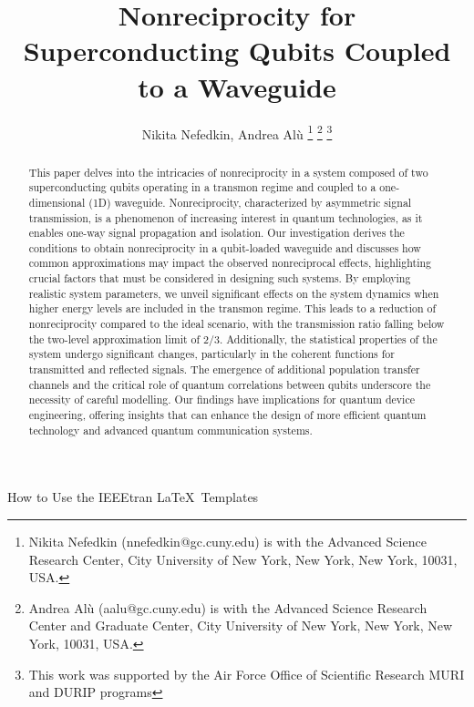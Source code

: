\documentclass[lettersize,journal]{IEEEtran}
\providecommand{\DIFaddtex}[1]{{\protect\color{blue}\uwave{#1}}} %
\providecommand{\DIFaddbegin}{} %
\providecommand{\DIFaddend}{} %
\providecommand{\DIFadd}[1]{\texorpdfstring{\DIFaddtex{#1}}{#1}} %
\newcommand{\DIFaddincludegraphics}[2][]{{\color{blue}\fbox{\DIFOincludegraphics[#1]{#2}}}} %
\DeclareRobustCommand{\DIFaddbegin}{\DIFOaddbegin \let\includegraphics\DIFaddincludegraphics} %
\DeclareRobustCommand{\DIFaddend}{\DIFOaddend \let\includegraphics\DIFOincludegraphics} %
\begin{document}
\title{\DIFaddbegin \DIFadd{Theory and Analysis of }\DIFaddend Nonreciprocity for Superconducting Qubits Coupled to a Waveguide}
\author{Nikita Nefedkin, Andrea Al{\`u} 
\thanks{Nikita Nefedkin (nnefedkin@gc.cuny.edu) is with the Advanced Science Research Center, City University of New York, New York, New York, 10031, USA.}
\thanks{Andrea Al\`u (aalu@gc.cuny.edu) is with the Advanced Science Research Center and Graduate Center, City University of New York, New York, New York, 10031, USA.}
\thanks{This work was supported by the Air Force Office of Scientific Research MURI and DURIP programs}}

%
{How to Use the IEEEtran \LaTeX \ Templates}

\maketitle

\begin{abstract}
This paper delves into the intricacies of nonreciprocity in a system composed of two superconducting qubits operating in a transmon regime and coupled to a one-dimensional (1D) waveguide. Nonreciprocity, characterized by asymmetric signal transmission, is a phenomenon of increasing interest in quantum technologies, as it enables one-way signal propagation and isolation. Our investigation derives the conditions to obtain nonreciprocity in a qubit-loaded waveguide and discusses how common approximations may impact the observed nonreciprocal effects, highlighting crucial factors that must be considered in designing such systems. By employing realistic system parameters, we unveil significant effects on the system dynamics when higher energy levels are included in the transmon regime. This leads to a reduction of nonreciprocity compared to the ideal scenario, with the transmission ratio falling below the two-level approximation limit of $2/3$. Additionally, the statistical properties of the system undergo significant changes, particularly in the coherent functions for transmitted and reflected signals. The emergence of additional population transfer channels and the critical role of quantum correlations between qubits underscore the necessity of careful modelling. Our findings have implications for quantum device engineering, offering insights that can enhance the design of more efficient quantum technology and advanced quantum communication systems.
\end{abstract}
\end{document}
